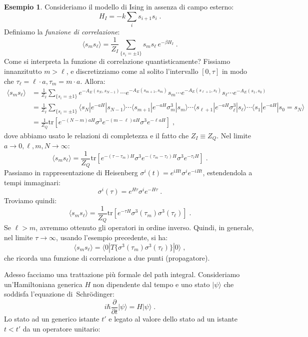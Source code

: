 \documentclass[12pt,a4paper]{article}
\theoremstyle{definition}
\newtheorem{exm}{Esempio}
\numberwithin{equation}{section}
\newcommand{\bra}{\langle}
\newcommand{\ket}{\rangle}
\newcommand{\Sch}{Schrödinger}
\newcommand{\tr}{\mathrm{tr}}
\begin{document}
\begin{exm} 
Consideriamo il modello di Ising in assenza di campo esterno:
$$
H_I=-k\sum_i s_{i+1}s_i\;.
$$
Definiamo la \emph{funzione di correlazione}:
\begin{equation}
\bra s_ms_{\ell}\ket=\frac{1}{Z_I}\sum_{\{s_i=\pm 1\}}s_ms_{\ell}\,e^{-\beta H_I}\;.
\end{equation}
Come si interpreta la funzione di correlazione quantisticamente? Fissiamo innanzitutto $m>\ell$, e discretizziamo come al solito l'intervallo $[0,\tau]$ in modo che $\tau_{\ell}=\ell\cdot a,\tau_m=m\cdot a$. Allora:
\begin{align*}
\bra s_ms_{\ell}\ket &= \frac{1}{Z_I}\sum_{\{s_i=\pm 1\}}e^{-A_E(s_N,s_{N-1})}\cdots e^{-A_E(s_{m+1},s_m)}s_m\cdots e^{-A_E(s_{\ell+1},s_{\ell})}s_{\ell}\cdots e^{-A_E(s_1,s_0)} \\
&= \frac{1}{Z_I}\sum_{\{s_i=\pm 1\}}\bra s_N|e^{-aH}|s_{N-1}\ket\cdots \bra s_{m+1}|e^{-aH}\sigma^3_m|s_m\ket\cdots \bra s_{\ell+1}|e^{-aH}\sigma^3_{\ell}|s_{\ell}\ket\cdots \bra s_1|e^{-aH}|s_0=s_N\ket \\
&= \frac{1}{Z_Q}\tr\left[e^{-(N-m)aH}\sigma^3e^{-(m-\ell)aH}\sigma^3e^{-\ell aH}\right]\;,
\end{align*}
dove abbiamo usato le relazioni di completezza e il fatto che $Z_I\equiv Z_Q$. Nel limite $a\to 0, \ell,m,N\to \infty$:
$$
\bra s_ms_{\ell}\ket=\frac{1}{Z_Q}\tr\left[e^{-(\tau-\tau_m)H}\sigma^3e^{-(\tau_m-\tau_{\ell})H}\sigma^3e^{-\tau_{\ell}H}\right]\;.
$$
Passiamo in rappresentazione di Heisenberg $\sigma^i(t)=e^{iHt}\sigma^ie^{-iHt}$, estendendola a tempi immaginari:
$$
\sigma^i(\tau)=e^{H\tau}\sigma^ie^{-H\tau}\;.
$$
Troviamo quindi:
$$
\bra s_ms_{\ell}\ket=\frac{1}{Z_Q}\tr\left[e^{-\tau H}\sigma^3(\tau_m)\sigma^3(\tau_{\ell})\right]\;.
$$
Se $\ell>m$, avremmo ottenuto gli operatori in ordine inverso. Quindi, in generale, nel limite $\tau\to\infty$, usando l'esempio precedente, si ha:
\begin{equation}
\bra s_ms_{\ell}\ket=\bra 0|T\{\sigma^3(\tau_m)\sigma^3(\tau_{\ell})\}|0\ket\;,
\end{equation}
che ricorda una funzione di correlazione a due punti (propagatore).
\end{exm}
Adesso facciamo una trattazione più formale del path integral. Consideriamo un'Hamiltoniana generica $H$ non dipendente dal tempo e uno stato $|\psi\ket$ che soddisfa l'equazione di\, \Sch:
$$
i\hbar\frac{\partial}{\partial t}|\psi\ket=H|\psi\ket\;.
$$
Lo stato ad un generico istante $t'$ e legato al valore dello stato ad un istante $t<t'$ da un operatore unitario:
\end{document}
